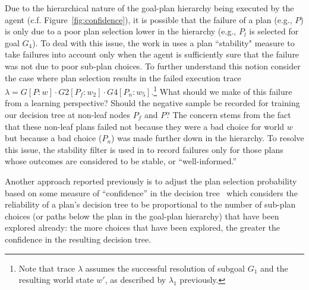 Due to the hierarchical nature of the goal-plan hierarchy being executed by the agent (c.f. Figure~\ref{fig:confidence}), it is possible that the failure of a plan (e.g., $P$) is only due to a poor plan selection lower in the hierarchy (e.g., $P_l$ is selected for goal $G_4$).
To deal with this issue, the work in \cite{airiau09:enhancing} uses a plan ``stability" measure to take failures into account only when the agent is sufficiently sure that the failure was not due to poor sub-plan choices. 
%
To further understand this notion consider the case where plan selection results in the failed execution trace $\lambda = G[P:w] \cdot G2[P_f:w_2] \cdot G4[P_n:w_5]$.\footnote{Note that trace $\lambda$ assumes the successful resolution of subgoal $G_1$ and the resulting world state $w'$, as described by $\lambda_1$ previously.} What should we make of this failure from a learning perspective? Should the negative sample be recorded for training our decision tree at non-leaf nodes $P_f$ and $P$? The concern stems from the fact that these non-leaf plans failed not because they were a bad choice for world $w$ but because a bad choice ($P_n$) was made further down in the hierarchy. To resolve this issue, the stability filter is used in \cite{airiau09:enhancing} to record failures only for those plans whose outcomes are considered to be stable, or ``well-informed.'' 
%

Another approach reported previously is to adjust the plan selection probability based on some measure of ``confidence'' in the decision tree~\cite{singh10:extending,singh10:learning} which considers the reliability of a plan's decision tree to be proportional to the number of sub-plan choices (or paths below the plan in the goal-plan hierarchy) that have been explored already: the more choices that have been explored, the greater the confidence in the resulting decision tree. 


